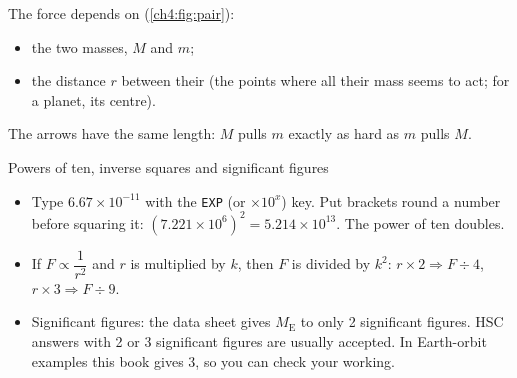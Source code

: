 \begin{sidebyside}[0.5]
  \centering
  \label{ch4:fig:pair}
\nextside
  The force depends on (\cref{ch4:fig:pair}):
  \begin{itemize}
    \item the two masses, $M$ and $m$;
    \item the distance $r$ between their  (the points where all their
          mass seems to act; for a planet, its centre).
  \end{itemize}
  The arrows have the same length: $M$ pulls $m$ exactly as hard as $m$ pulls $M$.
\end{sidebyside}

\begin{toolkit}{Powers of ten, inverse squares and significant figures}
\begin{itemize}
  \item Type $6.67\times10^{-11}$ with the \texttt{EXP} (or $\times10^x$) key. Put brackets round a
        number before squaring it: $(7.221\times10^{6})^2 = 5.214\times10^{13}$. The power of ten
        doubles.
  \item If $F \propto \dfrac{1}{r^2}$ and $r$ is multiplied by $k$, then $F$ is divided by $k^2$:
        $r \times 2 \Rightarrow F \div 4$, \ $r \times 3 \Rightarrow F \div 9$.
  \item Significant figures: the data sheet gives $M_\mathrm{E}$ to only 2 significant figures.
        HSC answers with 2 or 3 significant figures are usually accepted. In Earth-orbit examples
        this book gives 3, so you can check your working.
\end{itemize}
\end{toolkit}

